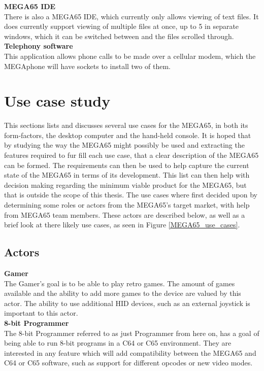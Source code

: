 \textbf{MEGA65 IDE}\\
There is also a MEGA65 IDE, which currently only allows viewing of text files. It does currently support viewing of multiple files at once, up to 5 in separate windows, which it can be switched between and the files scrolled through.\\

\textbf{Telephony software}\\
This application allows phone calls to be made over a cellular modem, which the MEGAphone will have sockets to install two of them. \\


\section{Use case study}
This sections lists and discusses several use cases for the MEGA65, in both its form-factors, the desktop computer and the hand-held console. It is hoped that by studying the way the MEGA65 might possibly be used and extracting the features required to fur fill each use case, that a clear description of the MEGA65 can be formed. The requirements can then be used to help capture the current state of the MEGA65 in terms of its development. This list can then help with decision making regarding the minimum viable product for the MEGA65, but that is outside the scope of this thesis. The use cases where first decided upon by determining some roles or actors from the MEGA65's target market, with help from MEGA65 team members. These actors are described below, as well as a brief look at there likely use cases, as seen in Figure \ref{MEGA65_use_cases}.

\subsection{Actors}
\textbf{Gamer}\\
The Gamer's goal is to be able to play retro games. The amount of games available and the ability to add more games to the device are valued by this actor. The ability to use additional HID devices, such as an external joystick is important to this actor.\\

\textbf{8-bit Programmer}\\
The 8-bit Programmer referred to as just Programmer from here on, has a goal of being able to run 8-bit programs in a C64 or C65 environment. They are interested in any feature which will add compatibility between the MEGA65 and C64 or C65 software, such as support for different opcodes or new video modes. \\

